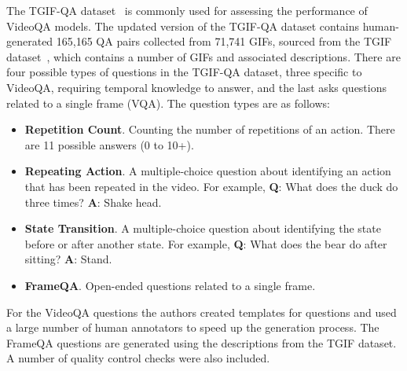 \documentclass[../interim.tex]{subfiles}
\begin{document}
The TGIF-QA dataset~\cite{dataset:tgif-qa} is commonly used for assessing the performance of VideoQA models. The updated version of the TGIF-QA dataset contains human-generated 165,165 QA pairs collected from 71,741 GIFs, sourced from the TGIF dataset~\cite{dataset:tgif}, which contains a number of GIFs and associated descriptions. There are four possible types of questions in the TGIF-QA dataset, three specific to VideoQA, requiring temporal knowledge to answer, and the last asks questions related to a single frame (VQA). The question types are as follows:
\begin{itemize}
  \item \textbf{Repetition Count}. Counting the number of repetitions of an action. There are 11 possible answers (0 to 10+).

  \item \textbf{Repeating Action}. A multiple-choice question about identifying an action that has been repeated in the video. For example, \textbf{Q}: What does the duck do three times? \textbf{A}: Shake head.

  \item \textbf{State Transition}. A multiple-choice question about identifying the state before or after another state. For example, \textbf{Q}: What does the bear do after sitting? \textbf{A}: Stand.

  \item \textbf{FrameQA}. Open-ended questions related to a single frame.
\end{itemize}

For the VideoQA questions the authors created templates for questions and used a large number of human annotators to speed up the generation process. The FrameQA questions are generated using the descriptions from the TGIF dataset. A number of quality control checks were also included.
\end{document}
